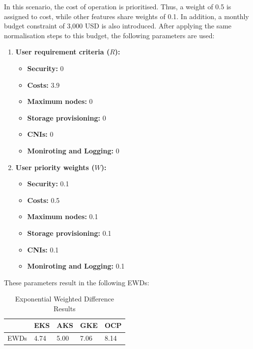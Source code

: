 In this scenario, the cost of operation is prioritised. Thus, a weight of 0.5 is assigned to cost, while other features share weights of 0.1. In addition, a monthly budget constraint of 3,000 USD is also introduced. After applying the same normalisation steps to this budget, the following parameters are used:

\begin{enumerate}
\def\labelenumi{\arabic{enumi}.}
\tightlist
\item
  \textbf{User requirement criteria (\(R\)):}
    \begin{itemize}
  \tightlist
  \item
    \textbf{Security:} 0
  \item
    \textbf{Costs:} 3.9
  \item
    \textbf{Maximum nodes:} 0
  \item
    \textbf{Storage provisioning:} 0
  \item
    \textbf{CNIs:} 0
  \item
    \textbf{Moniroting and Logging:} 0
  \end{itemize}
\item
  \textbf{User priority weights (\(W\)):}

  \begin{itemize}
  \tightlist
  \item
    \textbf{Security:} 0.1
  \item
    \textbf{Costs:} 0.5
  \item
    \textbf{Maximum nodes:} 0.1
  \item
    \textbf{Storage provisioning:} 0.1
  \item
    \textbf{CNIs:} 0.1
  \item
    \textbf{Moniroting and Logging:} 0.1
  \end{itemize}
\end{enumerate}

These parameters result in the following EWDs:

\begin{table}[!ht]
    \centering
    \begin{tabular}{|p{4cm}|p{2cm}|p{2cm}|p{2cm}|p{2cm}|} %
    \hline
         & EKS& AKS& GKE& OCP\\ \hline
 EWDs& 4.74& 5.00& 7.06 & 8.14\\\hline
    \end{tabular}
    \caption{Exponential Weighted Difference Results} 
    \label{tab:cost-analysis}
\end{table}

